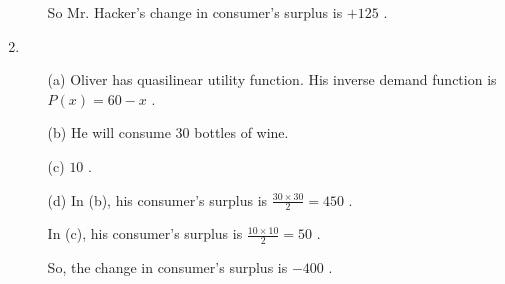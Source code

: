 \documentclass{article}
\begin{document}
\begin{enumerate}
\begin{enumerate}
        So Mr. Hacker’s change in consumer’s surplus is $+125$ .
    \end{enumerate}
    \item \begin{enumerate}
        \item[(a)] Oliver has quasilinear utility function. His inverse demand function is $P(x)=60-x$ .
        \item[(b)] He will consume $30$ bottles of wine.
        \item[(c)] $10$ .
        \item[(d)] In (b), his consumer's surplus is $\frac{30\times30}{2}=450$ . \par
        In (c), his consumer's surplus is $\frac{10\times10}{2}=50$ . \par
        So, the change in consumer’s surplus is $-400$ .
    \end{enumerate}
\end{enumerate}
\end{document}
